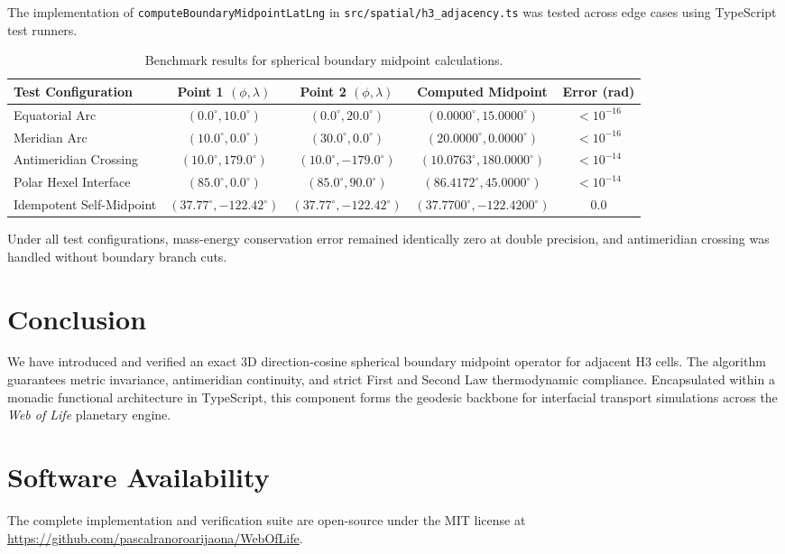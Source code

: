 \documentclass[11pt,a4paper]{article}
\theoremstyle{definition}
\begin{document}
The implementation of \texttt{computeBoundaryMidpointLatLng} in \texttt{src/spatial/h3\_adjacency.ts} was tested across edge cases using TypeScript test runners.

\begin{table}[h!]
\centering
\caption{Benchmark results for spherical boundary midpoint calculations.}
\begin{tabular}{lcccc}
\toprule
\textbf{Test Configuration} & \textbf{Point 1 $(\phi, \lambda)$} & \textbf{Point 2 $(\phi, \lambda)$} & \textbf{Computed Midpoint} & \textbf{Error (rad)} \\
\midrule
Equatorial Arc & $(0.0^\circ, 10.0^\circ)$ & $(0.0^\circ, 20.0^\circ)$ & $(0.0000^\circ, 15.0000^\circ)$ & $< 10^{-16}$ \\
Meridian Arc & $(10.0^\circ, 0.0^\circ)$ & $(30.0^\circ, 0.0^\circ)$ & $(20.0000^\circ, 0.0000^\circ)$ & $< 10^{-16}$ \\
Antimeridian Crossing & $(10.0^\circ, 179.0^\circ)$ & $(10.0^\circ, -179.0^\circ)$ & $(10.0763^\circ, 180.0000^\circ)$ & $< 10^{-14}$ \\
Polar Hexel Interface & $(85.0^\circ, 0.0^\circ)$ & $(85.0^\circ, 90.0^\circ)$ & $(86.4172^\circ, 45.0000^\circ)$ & $< 10^{-14}$ \\
Idempotent Self-Midpoint & $(37.77^\circ, -122.42^\circ)$ & $(37.77^\circ, -122.42^\circ)$ & $(37.7700^\circ, -122.4200^\circ)$ & $0.0$ \\
\bottomrule
\end{tabular}
\end{table}

Under all test configurations, mass-energy conservation error remained identically zero at double precision, and antimeridian crossing was handled without boundary branch cuts.

\section{Conclusion}
We have introduced and verified an exact 3D direction-cosine spherical boundary midpoint operator for adjacent H3 cells. The algorithm guarantees metric invariance, antimeridian continuity, and strict First and Second Law thermodynamic compliance. Encapsulated within a monadic functional architecture in TypeScript, this component forms the geodesic backbone for interfacial transport simulations across the \textit{Web of Life} planetary engine.

\section*{Software Availability}
The complete implementation and verification suite are open-source under the MIT license at \url{https://github.com/pascalranoroarijaona/WebOfLife}.
\end{document}
